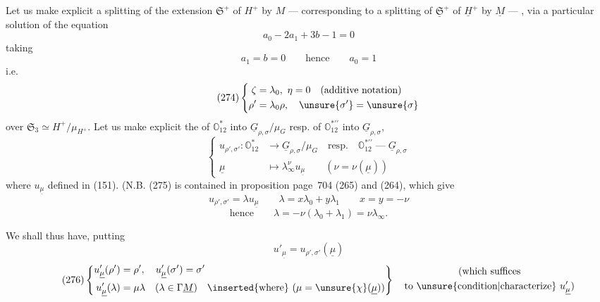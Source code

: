 
Let us make explicit a splitting of the extension
$\mathfrak S^+$ of $H^+$ by $M$
--- corresponding to a splitting of
$\underline{\mathfrak S}^+$ of $\underline H^+$
by $\underline M$ --- , via a particular solution of the equation
\[
\tag{273}
a_0-2a_1+3b-1=0
\]
taking
\[
a_1=b=0\qquad\text{hence}\qquad a_0=1
\]
i.e.
\[
\tag{274}
\left\{\begin{aligned}
\zeta&=\lambda_0,\ \eta=0\quad\text{(additive notation)}\\
\rho'&=\lambda_0\rho,\quad\unsure{\sigma'}=\unsure{\sigma}
\end{aligned}\right.
\]
over $\mathfrak S_3
\simeq H^+/\mu_{H^+}$.
Let us make explicit the 
 of $\mathbb O_{12}^*$ into
$\underline G_{\rho,\sigma}/\mu_G$ resp. of
$\mathbb O_{12}^{*\prime\prime}$ into $\underline G_{\rho,\sigma}$\unsure{;},
\[
\tag{275}
\left\{\begin{aligned}
u_{\rho',\sigma'}:\mathbb O_{12}^*&\longrightarrow
\underline G_{\rho,\sigma}/\mu_G
\quad\text{resp.}\quad\mathbb O_{12}^{*\prime\prime}
\mathrel{\text{---}}\underline G_{\rho,\sigma}
\\
\underline\mu&\longmapsto\lambda_\infty^{\nu}u_{\underline\mu}
\qquad(\nu=\nu(\underline\mu))
\end{aligned}\right.
\]
where $u_{\underline\mu}$ defined in (151).
(N.B.\unsure{\S} (275) is contained in proposition page~704
(265) and (264), which give
\[
u_{\rho',\sigma'}=\lambda u_{\underline\mu}\qquad
\lambda=x\lambda_0+y\lambda_1\qquad x=y=-\nu
\]
\[
\text{hence}\qquad\lambda=-\nu(\lambda_0+\lambda_1)=\nu\lambda_\infty.
\]

We shall thus have, putting
\[
u'_{\underline\mu}=u_{\rho',\sigma'}(\underline\mu)
\]
\[
\tag{276}
\left\{\begin{aligned}
u'_{\underline\mu}(\rho')&=\rho',\quad
u'_{\underline\mu}(\sigma')=\sigma'\\
u'_{\underline\mu}(\lambda)&=\mu\lambda\quad
(\lambda\in\Gamma\underline M)
\quad\inserted{\text{where}}\ (\mu=\unsure{\chi}(\underline\mu))
\end{aligned}\right\}
\quad\begin{gathered}
\text{(which suffices}\\
\text{to \unsure{condition|characterize}}\ u'_{\underline\mu})
\end{gathered}
\]

